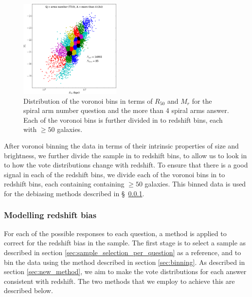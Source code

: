 \documentclass[useAMS,usenatbib]{mn2e}
\begin{document}
\begin{figure}
		\centering

        \includegraphics[width=0.45\textwidth]{Images/Bias/Debiasing/voronoi_bins.pdf}

        \caption{Distribution of the voronoi bins in terms of $R_{50}$ and $M_r$ for the spiral arm number question and the more than 4 spiral arms answer. Each of the voronoi bins is further divided in to redshift bins, each with $\geq 50$ galaxies.}

        \label{fig:voronoi_bins}

\end{figure}

After voronoi binning the data in terms of their intrinsic properties of size and brightness, we further divide the sample in to redshift bins, to allow us to look in to how the vote distributions change with redshift. To ensure that there is a good signal in each of the redshift bins, we divide each of the voronoi bins in to redshift bins, each containing containing $\geq 50$ galaxies. This binned data is used for the debiasing methods described in \S~\ref{sec:debiasing}.
\subsubsection{Modelling redshift bias}
\label{sec:debiasing}

For each of the possible responses to each question, a method is applied to correct for the redshift bias in the sample. The first stage is to select a sample as described in section \ref{sec:sample_selection_per_question} as a reference, and to bin the data using the method described in section \ref{sec:binning}. As described in section \ref{sec:new_method}, we aim to make the vote distributions for each answer consistent with redshift. The two methods that we employ to achieve this are described below. 
\end{document}
